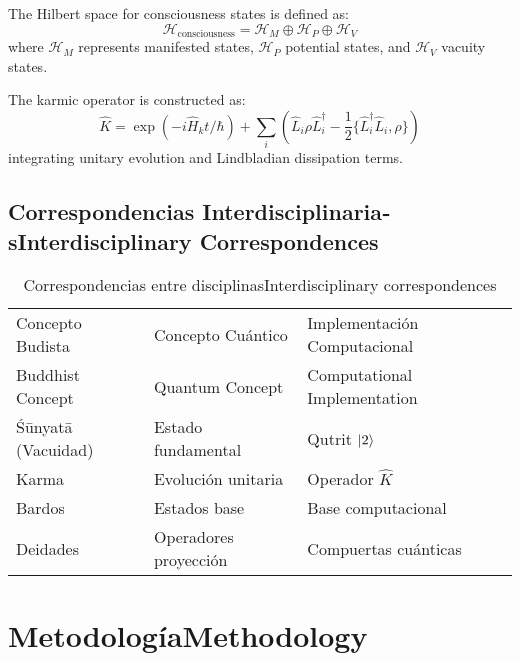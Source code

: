 \documentclass[12pt,a4paper]{article}
\newcommand{\es}[1]{\foreignlanguage{spanish}{#1}}
\newcommand{\en}[1]{\foreignlanguage{english}{#1}}
\begin{document}
\begin{otherlanguage}{english}
The Hilbert space for consciousness states is defined as:
\begin{equation}
\mathcal{H}_{\text{consciousness}} = \mathcal{H}_M \oplus \mathcal{H}_P \oplus \mathcal{H}_V
\end{equation}
where $\mathcal{H}_M$ represents manifested states, $\mathcal{H}_P$ potential states, and $\mathcal{H}_V$ vacuity states.

The karmic operator is constructed as:
\begin{equation}
\hat{K} = \exp\left(-i\hat{H}_k t/\hbar\right) + \sum_i \left(\hat{L}_i \rho \hat{L}_i^\dagger - \frac{1}{2}\{\hat{L}_i^\dagger \hat{L}_i, \rho\}\right)
\end{equation}
integrating unitary evolution and Lindbladian dissipation terms. \cite{hameroff2014, zurek2003}
\end{otherlanguage}

\subsection{\es{Correspondencias Interdisciplinarias}\en{Interdisciplinary Correspondences}}

\begin{otherlanguage}{spanish}
\begin{table}[H]
\centering
\caption{\es{Correspondencias entre disciplinas}\en{Interdisciplinary correspondences}}
\begin{tabular}{p{} p{} p{}}
\toprule
\es{Concepto Budista} & \es{Concepto Cuántico} & \es{Implementación Computacional} \\
\en{Buddhist Concept} & \en{Quantum Concept} & \en{Computational Implementation} \\
\midrule
Śūnyatā (Vacuidad) & Estado fundamental & Qutrit $\ket{2}$ \\
Karma & Evolución unitaria & Operador $\hat{K}$ \\
Bardos & Estados base & Base computacional \\
Deidades & Operadores proyección & Compuertas cuánticas \\
\bottomrule
\end{tabular}
\end{table}
\end{otherlanguage}

\section{\es{Metodología}\en{Methodology}}
\end{document}
